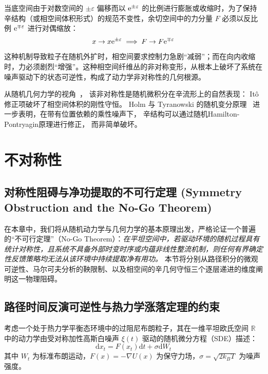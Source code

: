 ﻿\documentclass[10pt,a4paper]{article}
\numberwithin{equation}{section}
\begin{document}
当底空间由于对数空间的 $\pm\varepsilon$ 偏移而以 $\text e^{\pm\varepsilon}$ 的比例进行膨胀或收缩时，为了保持辛结构（或相空间体积形式）的规范不变性，余切空间中的力分量 $F$ 必须以反比例 $\text e^{\mp\varepsilon}$ 进行对偶缩放：
\begin{equation}
x \to x \text e^{\pm\varepsilon} \implies F \to F \text e^{\mp\varepsilon}
\end{equation}
这种机制导致粒子在随机外扩时，相空间要求控制力急剧“减弱”；而在向内收缩时，力必须剧烈“增强”。这种相空间纤维丛的非对称变形，从根本上破坏了系统在噪声驱动下的状态可逆性，构成了动力学非对称性的几何根源。

从随机几何力学的视角~\cite{Bismut1981}，
该非对称性是随机微积分在辛流形上的自然表现：
It\^{o} 修正项破坏了相空间体积的刚性守恒。
Holm 与 Tyranowski 的随机变分原理~\cite{HolmTyranowski2016}
进一步表明，在带有位置依赖的乘性噪声下，
辛结构可以通过随机Hamilton-Pontryagin原理进行修正，
而非简单破坏。

\section{不对称性}

\subsection{对称性阻碍与净功提取的不可行定理 (Symmetry Obstruction and the No-Go Theorem)}
\label{sec:symmetry_obstruction}

在本章中，我们将从随机动力学与几何力学的基本原理出发，严格论证一个普遍的“不可行定理”（No-Go Theorem）：\emph{在平坦空间中，若驱动环境的随机过程具有统计对称性，且系统不具备外部时变时序或内蕴非线性整流机制，则任何有界确定性反馈策略均无法从该环境中持续提取净有用功。} 本节将分别从路径积分的微观可逆性、马尔可夫分析的鞅限制、以及相空间的辛几何守恒三个逐层递进的维度阐明这一物理阻碍。

\subsection{路径时间反演可逆性与热力学涨落定理的约束}
\label{subsec:path_reversibility}

考虑一个处于热力学平衡态环境中的过阻尼布朗粒子，其在一维平坦欧氏空间 $\mathbb{R}$ 中的动力学由受对称加性高斯白噪声 $\xi(t)$ 驱动的随机微分方程（SDE）描述：
\begin{equation}
    \mathrm{d}x_t = F(x_t)\mathrm{d}t + \sigma \mathrm{d}W_t
\end{equation}
其中 $W_t$ 为标准布朗运动，$F(x) = -\nabla U(x)$ 为保守力场，$\sigma = \sqrt{2k_B T}$ 为噪声强度。
\end{document}
